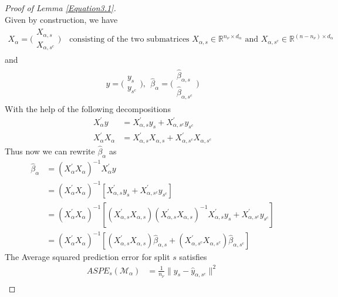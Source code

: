 \documentclass[Research_Module_ES.tex]{subfiles}
\begin{document}
\begin{proof}[Proof of Lemma \ref{Equation3.1}]~\\
	Given by construction, we have
	\begin{align*}
		X_\alpha=\Big(\begin{matrix}
		X_{\alpha,s}\\ X_{\alpha,s^c}
		\end{matrix}\Big)
		\text{~~~consisting of the two submatrices~} X_{\alpha,s}\in\mathbb{R}^{n_\nu\times d_\alpha} \text{~and~} X_{\alpha,s^c}\in\mathbb{R}^{(n-n_\nu)\times d_\alpha}
	\end{align*}
	and 
	\begin{align*}
		y=\Big(\begin{matrix}
		y_{s}\\ y_{s^c}
		\end{matrix}\Big),~~\hat{\beta}_\alpha=\Big(\begin{matrix}
		\hat{\beta}_{\alpha,s}\\ \hat{\beta}_{\alpha,s^c}
		\end{matrix}\Big)
	\end{align*}
	With the help of the following decompositions
	\begin{align*}
		X_\alpha^\prime y&=X_{\alpha,s}^\prime y_s+X_{\alpha,s^c}^\prime y_{s^c}\\
		X_\alpha^\prime X_\alpha&=X_{\alpha,s}^\prime X_{\alpha,s}+X_{\alpha,s^c}^\prime X_{\alpha,s^c}
	\end{align*}
	Thus now we can rewrite $\hat{\beta}_\alpha$ as
	\begin{align}
		\hat{\beta}_\alpha&=(X_\alpha^\prime X_\alpha)^{-1}X_\alpha^\prime y   \nonumber\\
		&=(X_\alpha^\prime X_\alpha)^{-1}[X_{\alpha,s}^\prime y_s+X_{\alpha,s^c}^\prime y_{s^c}]  \nonumber \\
		&=(X_\alpha^\prime X_\alpha)^{-1}[(X_{\alpha,s}^\prime X_{\alpha,s})(X_{\alpha,s}^\prime X_{\alpha,s})^{-1}X_{\alpha,s}^\prime y_s+X_{\alpha,s^c}^\prime y_{s^c}]  \nonumber \\
		&=(X_\alpha^\prime X_\alpha)^{-1}[(X_{\alpha,s}^\prime X_{\alpha,s}) \hat{\beta}_{\alpha,s}+(X_{\alpha,s^c}^\prime X_{\alpha,s^c})\hat{\beta}_{\alpha,s^c}]
		\label{beta_alpha_hat_decomposition}
	\end{align}
	The Average squared prediction error for split $s$ satisfies
	\begin{align*}
	ASPE_{s}(\mathcal{M}_\alpha)&=\frac{1}{n_\nu}\parallel y_s-\hat{y}_{\alpha,s^c}\parallel^2\\

\end{align*}
\end{proof}
\end{document}
